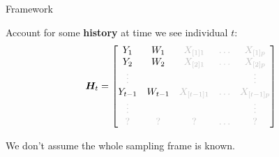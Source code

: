 \documentclass[xcolor={table}]{beamer}
\begin{document}
\note{
\scriptsize \singlespacing


}
%
%
%
%
%
\begin{frame}{Framework}

\begin{wideitemize}
\item Account for some \textbf{history} at time we see individual $t$: 
\[
\HB_t=
  \begin{bmatrix}
    Y_1 & W_1 & \textcolor{lightgray}{X_{[1]1}} & \textcolor{lightgray}{\hdots} & \textcolor{lightgray}{X_{[1]p}} \\
    Y_2 & W_2 &  \textcolor{lightgray}{X_{[2]1}} & \textcolor{lightgray}{\hdots} & \textcolor{lightgray}{X_{[2]p}} \\
    \textcolor{lightgray}{\vdots} & & & & \textcolor{lightgray}{\vdots} \\
    Y_{t-1} & W_{t-1}&  \textcolor{lightgray}{X_{[t-1]1}} & \textcolor{lightgray}{\hdots} &  \textcolor{lightgray}{X_{[t-1]p}} \\
    \textcolor{lightgray}{\vdots} & & & & \textcolor{lightgray}{\vdots} \\
    \textcolor{lightgray}{?} & \textcolor{lightgray}{?} & \textcolor{lightgray}{?} & \textcolor{lightgray}{\hdots} & \textcolor{lightgray}{?} 
  \end{bmatrix}
\]
\pause
\item We don't assume the whole sampling frame is known. 
\end{wideitemize}

\end{frame}
\end{document}
